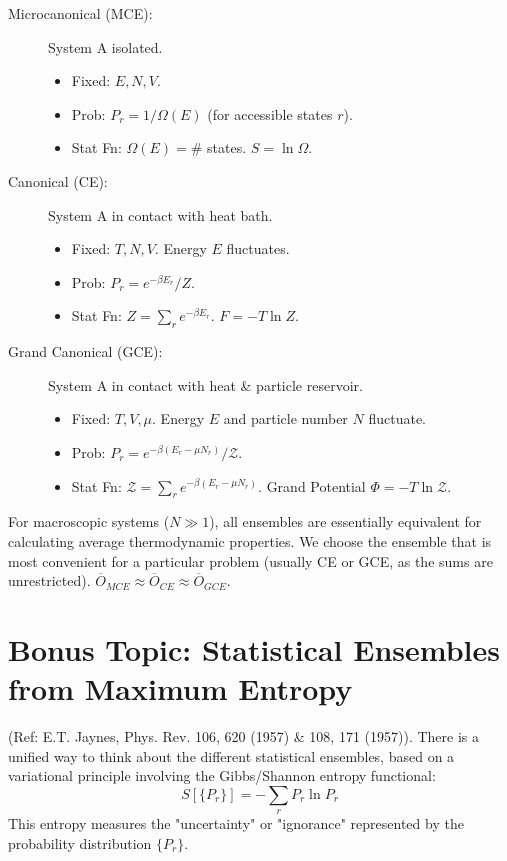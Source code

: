 \documentclass[11pt]{article}
\newcommand{\avg}[1]{\overline{#1}}
\newcommand{\grandpartfn}{\mathcal{Z}} %
\begin{document}
\begin{description}
    \item[Microcanonical (MCE):] System A isolated.
        \begin{itemize}
            \item Fixed: $E, N, V$.
            \item Prob: $P_r = 1/\Omega(E)$ (for accessible states $r$).
            \item Stat Fn: $\Omega(E) = \#$ states. $S = \ln \Omega$.
        \end{itemize}
    \item[Canonical (CE):] System A in contact with heat bath.
        \begin{itemize}
            \item Fixed: $T, N, V$. Energy $E$ fluctuates.
            \item Prob: $P_r = e^{-\beta E_r} / Z$.
            \item Stat Fn: $Z = \sum_r e^{-\beta E_r}$. $F = -T \ln Z$.
        \end{itemize}
    \item[Grand Canonical (GCE):] System A in contact with heat \& particle reservoir.
        \begin{itemize}
            \item Fixed: $T, V, \mu$. Energy $E$ and particle number $N$ fluctuate.
            \item Prob: $P_r = e^{-\beta(E_r - \mu N_r)} / \grandpartfn$.
            \item Stat Fn: $\grandpartfn = \sum_r e^{-\beta(E_r - \mu N_r)}$. Grand Potential $\Phi = -T \ln \grandpartfn$.
        \end{itemize}
\end{description}
For macroscopic systems ($N \gg 1$), all ensembles are essentially equivalent for calculating average thermodynamic properties. We choose the ensemble that is most convenient for a particular problem (usually CE or GCE, as the sums are unrestricted).
$\avg{O}_{MCE} \approx \avg{O}_{CE} \approx \avg{O}_{GCE}$.

\section*{Bonus Topic: Statistical Ensembles from Maximum Entropy}
(Ref: E.T. Jaynes, Phys. Rev. 106, 620 (1957) \& 108, 171 (1957)).
There is a unified way to think about the different statistical ensembles, based on a variational principle involving the Gibbs/Shannon entropy functional:
\[ S[\{P_r\}] = -\sum_r P_r \ln P_r \]
This entropy measures the "uncertainty" or "ignorance" represented by the probability distribution $\{P_r\}$.
\end{document}
